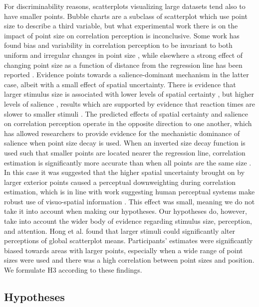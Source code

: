 \documentclass[manuscript, review, anonymous, screen]{acmart}
\begin{document}
For discriminability reasons, scatterplots visualizing large datasets
tend also to have smaller points. Bubble charts are a subclass of
scatterplot which use point size to describe a third variable, but what
experimental work there is on the impact of point size on correlation
perception is inconclusive. Some work has found bias and variability in
correlation perception to be invariant to both uniform and irregular
changes in point size \citep{rensink_2012, rensink_2014}, while
elsewhere a strong effect of changing point size as a function of
distance from the regression line has been reported
\citep{strain_2023b}. Evidence points towards a salience-dominant
mechanism in the latter case, albeit with a small effect of spatial
uncertainty. There is evidence that larger stimulus size is associated
with lower levels of spatial certainty \citep{alais_2004}, but higher
levels of salience \citep{healey_2011}, results which are supported by
evidence that reaction times are slower to smaller stimuli
\citep{gramazio_2014, osaka_1976}. The predicted effects of spatial
certainty and salience on correlation perception operate in the opposite
direction to one another, which has allowed researchers to provide
evidence for the mechanistic dominance of salience when point size decay
is used. When an inverted size decay function is used such that smaller
points are located nearer the regression line, correlation estimation is
significantly more accurate than when all points are the same size
\citep{strain_2023b}. In this case it was suggested that the higher
spatial uncertainty brought on by larger exterior points caused a
perceptual downweighting during correlation estimation, which is in line
with work suggesting human perceptual systems make robust use of
visuo-spatial information
\citep{strain_2023b, warren_2002, warren_2004}. This effect was small,
meaning we do not take it into account when making our hypotheses. Our
hypotheses do, however, take into account the wider body of evidence
regarding stimulus size, perception, and attention. Hong et al.
\citep{hong_2021} found that larger stimuli could significantly alter
perceptions of global scatterplot means. Participants' estimates were
significantly biased towards areas with larger points, especially when a
wide range of point sizes were used and there was a high correlation
between point sizes and position. We formulate H3 according to these
findings.

\hypertarget{hypotheses}{%
\subsection{Hypotheses}\label{hypotheses}}
\end{document}
